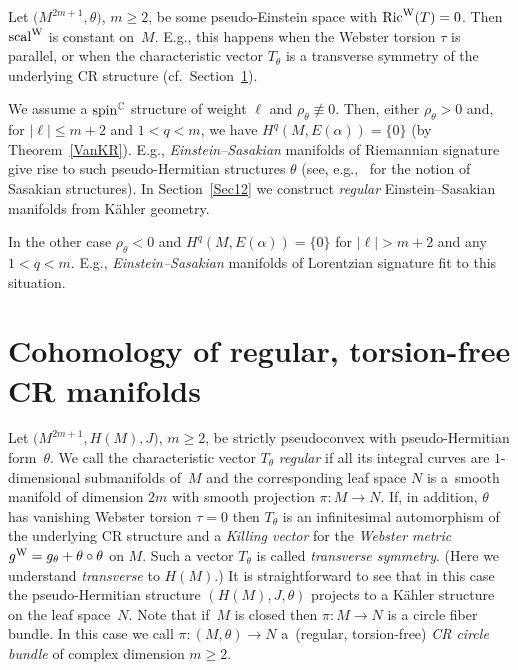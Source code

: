 \documentclass[10pt,a4paper]{amsart}
\numberwithin{equation}{section}
\newcommand{\CC}{\mathbb{C}}
\begin{document}
\begin{Example} Let $\big(M^{2m+1},\theta\big)$, $m\geq 2$, be some pseudo-Einstein space with $\operatorname{Ric}^{\rm W}(T)=0$.
Then ${\rm scal}^{\rm W}$ is constant on~$M$. E.g., this happens when the Webster torsion $\tau$ is parallel,
or when the characteristic vector $T_\theta$ is a transverse symmetry of the underlying CR structure
(cf.\ Section~\ref{Sec11}).

We assume a ${\rm spin}^\CC$ structure of weight $\ell$ and $\rho_\theta\not\equiv 0$.
Then, either $\rho_\theta>0$ and, for $|\ell|\leq m+2$ and $1<q<m$,
we have $H^q(M,E(\alpha))=\{0\}$ (by Theorem~\ref{VanKR}).
E.g., {\em Einstein--Sasakian} manifolds of Riemannian signature give rise to such pseudo-Hermitian structures $\theta$
(see, e.g.,~\cite{Blair} for the notion of Sasakian structures).
In Section~\ref{Sec12} we construct {\em regular} Einstein--Sasakian manifolds from K\"ahler geometry.

In the other case $\rho_\theta<0$ and $H^q(M,E(\alpha))=\{0\}$ for $|\ell|> m+2$ and any $1<q<m$.
E.g., {\em Einstein--Sasakian} manifolds of Lorentzian signature fit to this situation.
\end{Example}

\section{Cohomology of regular, torsion-free CR manifolds} \label{Sec11}

Let $\big(M^{2m+1},H(M),J\big)$, $m\geq 2$, be strictly pseudoconvex with pseudo-Hermitian form~$\theta$. We call the characteristic vector
$T_\theta$ {\em regular} if all its integral curves are $1$-dimensional submanifolds of~$M$ and the corresponding leaf space $N$ is a~smooth manifold
of dimension $2m$ with smooth projection $\pi\colon M\to N$. If, in addition, $\theta$ has vanishing Webster torsion $\tau=0$ then $T_\theta$ is an infinitesimal
automorphism of the underlying CR structure and a {\em Killing vector} for the {\em Webster metric} $g^{\rm W}=g_\theta+\theta\circ\theta$ on $M$.
Such a vector $T_\theta$ is called {\em transverse symmetry}. (Here we understand {\em transverse} to $H(M)$.)
It is
straightforward to see that in this case the pseudo-Hermitian structure
 $(H(M),J,\theta)$ projects to a K\"ahler structure on the leaf space~$N$. Note that if~$M$ is closed then $\pi\colon M\to N$ is a circle fiber bundle. In this case we call $\pi\colon (M,\theta)\to N$ a~(regular, torsion-free) {\em CR circle bundle} of complex dimension $m\geq 2$.
\end{document}
